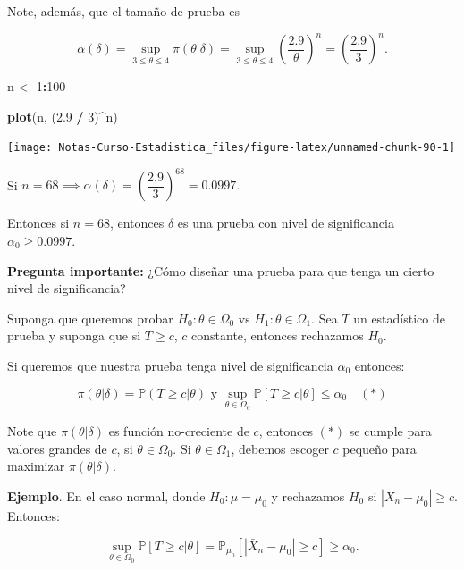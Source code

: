 \documentclass[
  12pt,
]{book}
\newenvironment{Shaded}{\begin{snugshade}}{\end{snugshade}}
\newcommand{\DecValTok}[1]{\textcolor[rgb]{0.00,0.00,0.81}{#1}}
\newcommand{\FloatTok}[1]{\textcolor[rgb]{0.00,0.00,0.81}{#1}}
\newcommand{\KeywordTok}[1]{\textcolor[rgb]{0.13,0.29,0.53}{\textbf{#1}}}
\newcommand{\NormalTok}[1]{#1}
\newcommand{\OperatorTok}[1]{\textcolor[rgb]{0.81,0.36,0.00}{\textbf{#1}}}
\newcommand{\StringTok}[1]{\textcolor[rgb]{0.31,0.60,0.02}{#1}}
\begin{document}
Note, además, que el tamaño de prueba es

\[\alpha(\delta) = \sup_{3\leq\theta\leq 4} \pi(\theta|\delta) =
\sup_{3\leq\theta\leq 4}\left(\dfrac{2.9}{\theta}\right)^n =
\left(\dfrac{2.9}{3}\right)^n.\]

\begin{Shaded}
\begin{Highlighting}[]
\NormalTok{n \textless{}{-}}\StringTok{ }\DecValTok{1}\OperatorTok{:}\DecValTok{100}

\KeywordTok{plot}\NormalTok{(n, (}\FloatTok{2.9} \OperatorTok{/}\StringTok{ }\DecValTok{3}\NormalTok{)}\OperatorTok{\^{}}\NormalTok{n)}
\end{Highlighting}
\end{Shaded}

\begin{center}\texttt{[image: Notas-Curso-Estadistica\_files/figure-latex/unnamed-chunk-90-1]} \end{center}

Si \(n = 68 \implies \alpha(\delta)= \left(\dfrac{2.9}{3}\right)^{68} = 0.0997.\)

Entonces si \(n = 68\), entonces \(\delta\) es una prueba con nivel de
significancia \(\alpha_0\geq 0.0997\).

\textbf{Pregunta importante:} ¿Cómo diseñar una prueba para que tenga un cierto nivel
de significancia?

Suponga que queremos probar \(H_0: \theta \in \Omega_0\) vs \(H_1: \theta\in\Omega_1\). Sea \(T\) un estadístico de prueba y suponga que si \(T\geq c\),
\(c\) constante, entonces rechazamos \(H_0\).

Si queremos que nuestra prueba tenga nivel de significancia \(\alpha_0\) entonces:

\[\pi(\theta|\delta) = \mathbb P(T\geq c|\theta)\text{ y } \sup_{\theta \in
\Omega_0}\mathbb P[T\geq c|\theta] \leq \alpha_0 \quad (*)\]

Note que \(\pi(\theta|\delta)\) es función no-creciente de \(c\), entonces \((*)\) se
cumple para valores grandes de \(c\), si \(\theta\in\Omega_0\). Si \(\theta \in \Omega_1\), debemos escoger \(c\) pequeño para maximizar \(\pi(\theta|\delta)\).

\textbf{Ejemplo}. En el caso normal, donde \(H_0: \mu = \mu_0\) y rechazamos \(H_0\) si
\(|\bar X_n-\mu_0|\geq c\). Entonces:

\[\sup_{\theta\in\Omega_0} \mathbb P [T\geq c|\theta] = \mathbb P_{\mu_0}[|\bar
X_n-\mu_0|\geq c]\geq \alpha_0.\]
\end{document}
